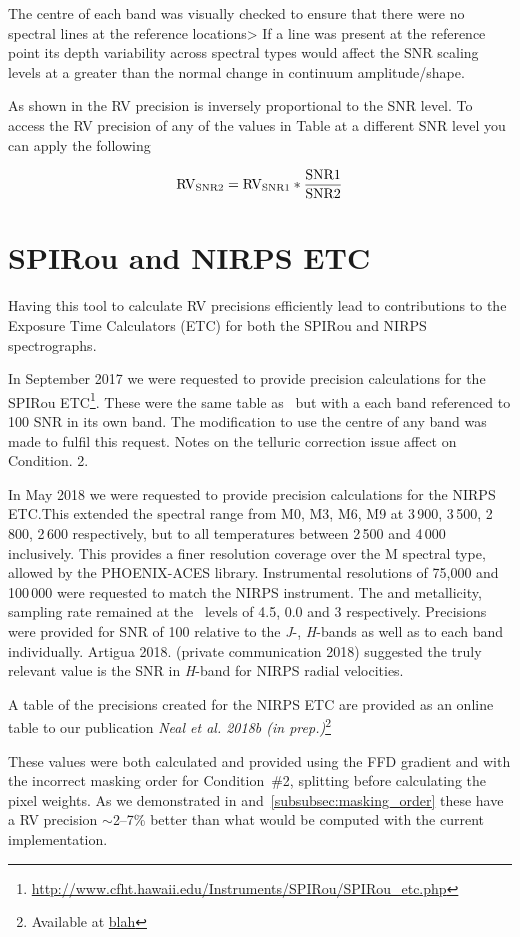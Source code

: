The centre of each band was visually checked to ensure that there were no spectral lines at the reference locations> If a line was present at the reference point its depth variability across spectral types would affect the {SNR} scaling levels at a greater than the normal change in continuum amplitude/shape.

As shown in  the {RV} precision is inversely proportional to the {SNR} level. To access the {RV} precision of any of the values in Table at a different {SNR} level you can apply the following

\begin{equation}
\rm RV_{SNR2} = RV_{SNR1} * \frac{SNR1}{SNR2}
\end{equation}


\section{SPIRou and NIRPS ETC}\label{sec:spirou_nirps_etc}
Having this tool to calculate {RV} precisions efficiently lead to contributions to the Exposure Time Calculators (ETC) for both the SPIRou and NIRPS spectrographs.

In September 2017 we were requested to provide precision calculations for the SPIRou ETC\footnote{\url{http://www.cfht.hawaii.edu/Instruments/SPIRou/SPIRou_etc.php}}. These were the same table as~\citet{figueira_radial_2016} but with a each band referenced to 100 {SNR} in its own band. The modification to use the centre of any band was made to fulfil this request. Notes on the telluric correction issue affect on Condition. 2.

In May 2018 we were requested to provide precision calculations for the NIRPS {ETC}.\@ This extended the spectral range from {M0}, {M3}, {M6}, {M9} at 3\,900, 3\,500, 2\,800, 2\,600\K{} respectively, but to all temperatures between 2\,500 and 4\,000\K{} inclusively. This provides a finer resolution coverage over the M spectral type, allowed by the {PHOENIX-ACES} library.
Instrumental resolutions of 75,000 and 100\,000 were requested to match the NIRPS instrument.
The \logg{} and metallicity, sampling rate remained at the~\citet{figueira_radial_2016} levels of 4.5, 0.0 and 3 respectively.
Precisions were provided for {SNR} of 100 relative to the \emph{J}-, \emph{H}-bands as well as to each band individually. Artigua 2018. (private communication 2018) suggested the truly relevant value is the {SNR} in \emph{H}-band for NIRPS radial velocities.

A table of the precisions created for the NIRPS ETC are provided as an online table to our publication \textit{Neal et al. 2018b (in prep.)}\footnote{Available at \href{blah}{blah}} 


These values were both calculated and provided using the {FFD} gradient and with the incorrect masking order for Condition~\#2, splitting before calculating the pixel weights. As we demonstrated in  and~\ref{subsubsec:masking_order} these have a {RV} precision \(\sim\)2--7\% better than what would be computed with the current implementation.
